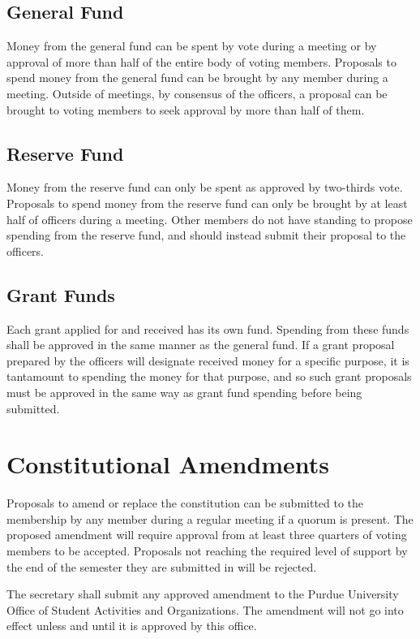 \documentclass{article}
\begin{document}
\subsection{General Fund}

Money from the general fund can be spent by vote during a meeting or by approval
of more than half of the entire body of voting members. Proposals to spend money
from the general fund can be brought by any member during a meeting. Outside of
meetings, by consensus of the officers, a proposal can be brought to voting
members to seek approval by more than half of them.

\subsection{Reserve Fund}

Money from the reserve fund can only be spent as approved by two-thirds vote.
Proposals to spend money from the reserve fund can only be brought by at least
half of officers during a meeting. Other members do not have standing to propose
spending from the reserve fund, and should instead submit their proposal to the
officers.

\subsection{Grant Funds}

Each grant applied for and received has its own fund. Spending from these funds
shall be approved in the same manner as the general fund. If a grant proposal
prepared by the officers will designate received money for a specific purpose,
it is tantamount to spending the money for that purpose, and so such grant
proposals must be approved in the same way as grant fund spending before being
submitted.

\section{Constitutional Amendments}

Proposals to amend or replace the constitution can be submitted to the
membership by any member during a regular meeting if a quorum is present. The
proposed amendment will require approval from at least three quarters of voting
members to be accepted. Proposals not reaching the required level of support by
the end of the semester they are submitted in will be rejected.

The secretary shall submit any approved amendment to the Purdue University
Office of Student Activities and Organizations. The amendment will not go into
effect unless and until it is approved by this office.
\end{document}
